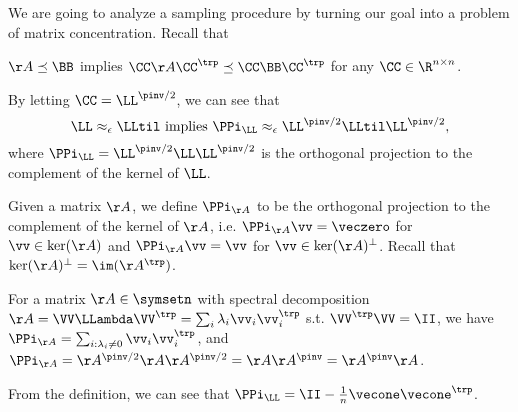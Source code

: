 We are going to analyze a sampling procedure by turning our goal into
a problem of matrix concentration.
Recall that
\begin{fact}
  $\AA \preceq \BB$ implies $\CC \AA \CC^\trp \preceq \CC \BB \CC^\trp
  $ for any $\CC \in \R^{n\times n}$.
\end{fact}
By letting $\CC = \LL^{\pinv/2}$, we can see that
\begin{equation}
  \label{eq:spectralreltoabs}
  \LL \approx_{\epsilon} \LLtil \text{ implies } \PPi_{\LL}
  \approx_{\epsilon} \LL^{\pinv/2}\LLtil\LL^{\pinv/2}
  ,
\end{equation}
where $\PPi_{\LL} = \LL^{\pinv/2}\LL\LL^{\pinv/2}$ is the orthogonal
projection to the complement of the kernel of $\LL$.
\begin{definition}
  Given a matrix $\AA$, we define $\PPi_{\AA}$ to be the orthogonal
  projection to the complement of the kernel of $\AA$,
  i.e. $\PPi_{\AA} \vv = \veczero$ for $\vv \in \ker(\AA)$ and
  $\PPi_{\AA} \vv = \vv$ for $\vv \in  \ker(\AA)^{\perp}$.
  Recall that $\ker(\AA)^{\perp} = \im(\AA^{\trp})$.
\end{definition}
\begin{claim}
  For a matrix $\AA \in \symsetn$ with spectral decomposition  $\AA =
  \VV\LLambda\VV^\trp = \sum_{i} \lambda_i \vv_i \vv_i^{\trp}$ s.t. $\VV^\trp \VV = \II$,
  we have $\PPi_{\AA} = \sum_{i : \lambda_i \neq 0} \vv_i \vv_i^{\trp}$, and
  $\PPi_{\AA} = \AA^{\pinv/2}\AA\AA^{\pinv/2} = \AA\AA^{\pinv} =  \AA^{\pinv}\AA $.
\end{claim}
From the definition, we can see that
$\PPi_{\LL}= \II - \frac{1}{n}\vecone\vecone^{\trp}$.

